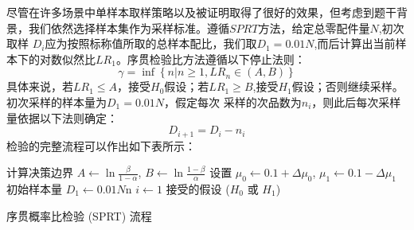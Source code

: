 \documentclass[withoutpreface,bwprint]{cumcmthesis} %
\begin{document}
尽管在许多场景中单样本取样策略以及被证明取得了很好的效果，但考虑到题干背景，我们依然选择样本集作为采样标准。遵循$SPRT$方法，给定总零配件量$N$,初次取样
$D_i$应为按照标称值所取的总样本配比，我们取$D_1=0.01N$,而后计算出当前样本下的对数似然比$LR_1$。序贯检验比方法遵循以下停止法则：
\begin{equation}
	\gamma = \inf \left\{ n | n \geq 1, LR_n \in (A, B) \right\}
\end{equation}
具体来说，若$LR_1 \le A$，接受$H_0$假设；若$LR_1 \ge B$,接受$H_1$假设；否则继续采样。初次采样的样本量为$D_1=0.01N$，假定每次
采样的次品数为$n_i$，则此后每次采样量依据以下法则确定：
\begin{equation}
	D_{i+1}=D_i-n_i
\end{equation}
检验的完整流程可以作出如下表所示：

\begin{adjustbox}{width=16cm,height=7cm}
	\centering
	\begin{algorithm}[H]
		\SetAlgoLined
		计算决策边界 $A \gets \ln \frac{\beta}{1 - \alpha}$, $B \gets \ln \frac{1 - \beta}{\alpha}$\;
		设置 $\mu_0 \gets 0.1 + \Delta \mu_0$, $\mu_1 \gets 0.1 - \Delta \mu_1$\;
		初始样本量 $D_1 \gets 0.01N$n\;
		$i \gets 1$\;
		\Return 接受的假设 ($H_0$ 或 $H_1$)
		\label{alg:sprt}
		\caption{序贯概率比检验 (SPRT) 流程}
	\end{algorithm}
\end{adjustbox}
\end{document}
